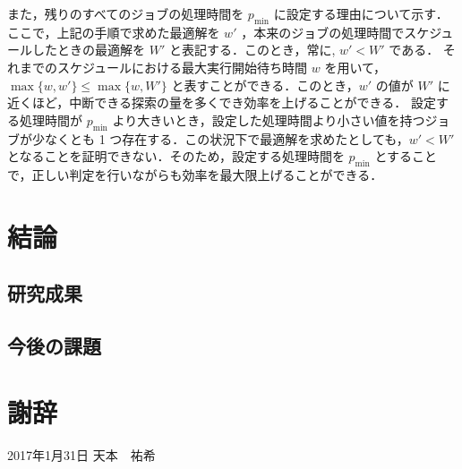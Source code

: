 \documentclass[12pt]{optlab-bachelor}
\def\氏名{天本　祐希}
\begin{document}
また，残りのすべてのジョブの処理時間を $p_{\min}$ に設定する理由について示す．
ここで，上記の手順で求めた最適解を $w'$ ，本来のジョブの処理時間でスケジュールしたときの最適解を $W'$ と表記する．このとき，常に, $w' < W'$ である．
それまでのスケジュールにおける最大実行開始待ち時間 $w$ を用いて，
$\max \{ w, w'\} \le \max \{ w, W'\}$ と表すことができる．このとき，$w'$ の値が $W'$ に近くほど，中断できる探索の量を多くでき効率を上げることができる．
設定する処理時間が $p_{\min}$ より大きいとき，設定した処理時間より小さい値を持つジョブが少なくとも 1 つ存在する．この状況下で最適解を求めたとしても，$w' < W'$ となることを証明できない．そのため，設定する処理時間を $p_{\min}$ とすることで，正しい判定を行いながらも効率を最大限上げることができる．

\chapter{結論}\label{c_6}
\section{研究成果}
\section{今後の課題}




\chapter*{謝辞}

\begin{flushright}
  2017年1月31日 \氏名
\end{flushright}
\endmatter
\end{document}
